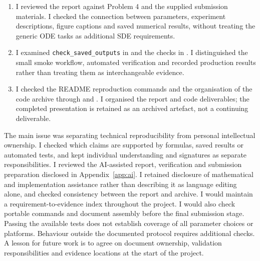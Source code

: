 \begin{enumerate}[leftmargin=2em,itemsep=2pt,topsep=2pt]
\item I reviewed the report against Problem 4 and the supplied submission materials. I checked the connection between parameters, experiment descriptions, figure captions and saved numerical results, without treating the generic ODE tasks as additional SDE requirements.
\item I examined \texttt{check\_saved\_outputs} in  and the checks in . I distinguished the small smoke workflow, automated verification and recorded production results rather than treating them as interchangeable evidence.
\item I checked the README reproduction commands and the organisation of the code archive through  and . I organised the report and code deliverables; the completed presentation is retained as an archived artefact, not a continuing deliverable.
\end{enumerate}
The main issue was separating technical reproducibility from personal intellectual ownership. I checked which claims are supported by formulas, saved results or automated tests, and kept individual understanding and signatures as separate responsibilities.
I reviewed the AI-assisted report, verification and submission preparation disclosed in Appendix~\ref{app:ai}. I retained disclosure of mathematical and implementation assistance rather than describing it as language editing alone, and checked consistency between the report and archive.
I would maintain a requirement-to-evidence index throughout the project. I would also check portable commands and document assembly before the final submission stage.
Passing the available tests does not establish coverage of all parameter choices or platforms. Behaviour outside the documented protocol requires additional checks.
A lesson for future work is to agree on document ownership, validation responsibilities and evidence locations at the start of the project.
\IndividualStatementEnd
